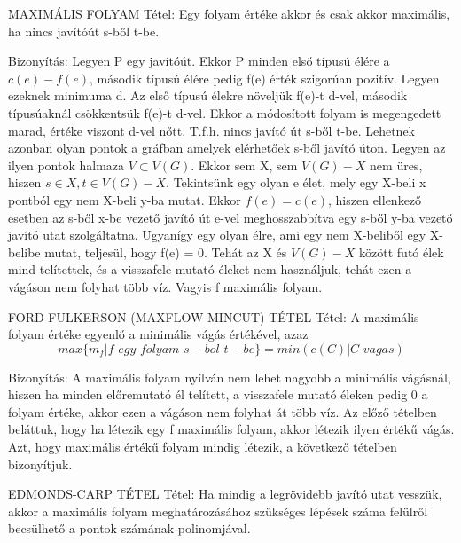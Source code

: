 \documentclass[]{article}
\begin{document}
\begin{framed}
MAXIMÁLIS FOLYAM Tétel: Egy folyam értéke akkor és csak akkor maximális, ha nincs javítóút s-ből t-be.
\end{framed}
\begin{leftbar}
Bizonyítás: Legyen P egy javítóút. Ekkor P minden első típusú élére a $c(e) - f(e)$, második típusú élére pedig f(e) érték szigorúan pozitív. Legyen ezeknek minimuma d. Az első típusú élekre növeljük f(e)-t d-vel, második típusúaknál csökkentsük f(e)-t d-vel. Ekkor a módosított folyam is megengedett marad, értéke viszont d-vel nőtt. T.f.h. nincs javító út s-ből t-be. Lehetnek azonban olyan pontok a gráfban amelyek elérhetőek s-ből javító úton. Legyen az ilyen pontok halmaza $V \subset V(G)$. Ekkor sem X, sem $V(G) - X$ nem üres, hiszen $s \in X, t\in V(G) - X$. Tekintsünk egy olyan e élet, mely egy X-beli x pontból egy nem X-beli y-ba mutat. Ekkor $f(e) = c(e)$, hiszen ellenkező esetben az s-ből x-be vezető javító út e-vel meghosszabbítva egy s-ből y-ba vezető javító utat szolgáltatna. Ugyanígy egy olyan élre, ami egy nem X-beliből egy X-belibe mutat, teljesül, hogy f(e) = 0. Tehát az X és $V(G) - X$ között futó élek mind telítettek, és a visszafele mutató éleket nem használjuk, tehát ezen a vágáson nem folyhat több víz. Vagyis f maximális folyam.
\end{leftbar}
\begin{framed}
FORD-FULKERSON (MAXFLOW-MINCUT) TÉTEL Tétel: A maximális folyam értéke egyenlő a minimális vágás értékével, azaz
$$max\{m_f|f\,\,egy\,\,folyam\,\,s-bol\,\,t-be\} = min(c(C)|C\,\,vagas)$$
\end{framed}
\begin{leftbar}
Bizonyítás: A maximális folyam nyílván nem lehet nagyobb a minimális vágásnál, hiszen ha minden előremutató él telített, a visszafele mutató éleken pedig 0 a folyam értéke, akkor ezen a vágáson nem folyhat át több víz. Az előző tételben beláttuk, hogy ha létezik egy f maximális folyam, akkor létezik ilyen értékű vágás. Azt, hogy maximális értékű folyam mindig létezik, a következő tételben bizonyítjuk. 
\end{leftbar}
\begin{framed}
EDMONDS-CARP TÉTEL Tétel: Ha mindig a legrövidebb javító utat vesszük, akkor a maximális folyam meghatározásához szükséges lépések száma felülről becsülhető a pontok számának polinomjával.
\end{framed}
\end{document}
